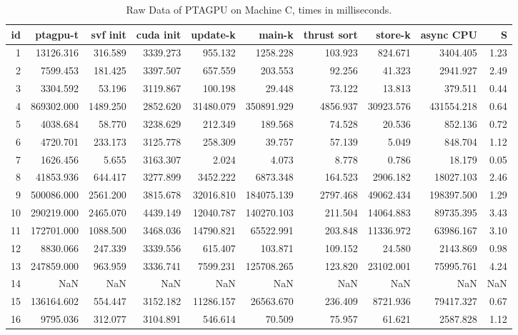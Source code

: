 \begin{table}[ht]
    \tiny
    \begin{tabular}{rrrrrrrrrr}
        \toprule
        id & ptagpu-t   & svf init & cuda init & update-k  & main-k     & thrust sort & store-k   & async CPU  & S    \\
        \midrule
        1  & 13126.316  & 316.589  & 3339.273  & 955.132   & 1258.228   & 103.923     & 824.671   & 3404.405   & 1.23 \\
        2  & 7599.453   & 181.425  & 3397.507  & 657.559   & 203.553    & 92.256      & 41.323    & 2941.927   & 2.49 \\
        3  & 3304.592   & 53.196   & 3119.867  & 100.198   & 29.448     & 73.122      & 13.813    & 379.511    & 0.44 \\
        4  & 869302.000 & 1489.250 & 2852.620  & 31480.079 & 350891.929 & 4856.937    & 30923.576 & 431554.218 & 0.64 \\
        5  & 4038.684   & 58.770   & 3238.629  & 212.349   & 189.568    & 74.528      & 20.536    & 852.136    & 0.72 \\
        6  & 4720.701   & 233.173  & 3125.778  & 258.309   & 39.757     & 57.139      & 5.049     & 848.704    & 1.12 \\
        7  & 1626.456   & 5.655    & 3163.307  & 2.024     & 4.073      & 8.778       & 0.786     & 18.179     & 0.05 \\
        8  & 41853.936  & 644.417  & 3277.899  & 3452.222  & 6873.348   & 164.523     & 2906.182  & 18027.103  & 2.46 \\
        9  & 500086.000 & 2561.200 & 3815.678  & 32016.810 & 184075.139 & 2797.468    & 49062.434 & 198397.500 & 1.29 \\
        10 & 290219.000 & 2465.070 & 4439.149  & 12040.787 & 140270.103 & 211.504     & 14064.883 & 89735.395  & 3.43 \\
        11 & 172701.000 & 1088.500 & 3468.036  & 14790.821 & 65522.991  & 203.848     & 11336.972 & 63986.167  & 3.10 \\
        12 & 8830.066   & 247.339  & 3339.556  & 615.407   & 103.871    & 109.152     & 24.580    & 2143.869   & 0.98 \\
        13 & 247859.000 & 963.959  & 3336.741  & 7599.231  & 125708.265 & 123.820     & 23102.001 & 75995.761  & 4.24 \\
        14 & NaN        & NaN      & NaN       & NaN       & NaN        & NaN         & NaN       & NaN        & NaN  \\
        15 & 136164.602 & 554.447  & 3152.182  & 11286.157 & 26563.670  & 236.409     & 8721.936  & 79417.327  & 0.67 \\
        16 & 9795.036   & 312.077  & 3104.891  & 546.614   & 70.509     & 75.957      & 61.621    & 2587.828   & 1.12 \\
        \bottomrule
    \end{tabular}
    \caption{Raw Data of PTAGPU on Machine C, times in milliseconds.}
\end{table}
\normalsize

